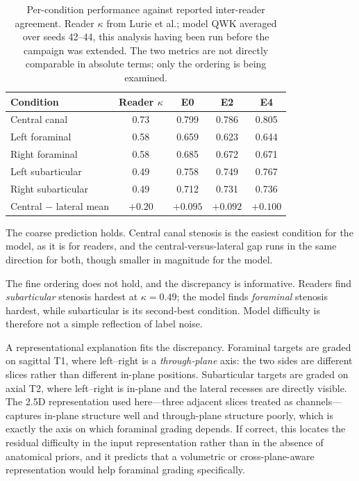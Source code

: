 \documentclass[12pt,a4paper]{report}
\begin{document}
\begin{table}[htbp]
\centering
\caption{Per-condition performance against reported inter-reader agreement.
Reader $\kappa$ from Lurie et al.; model QWK averaged over seeds 42--44, this
analysis having been run before the campaign was extended. The two
metrics are not directly comparable in absolute terms; only the ordering is
being examined.}
\label{tab:disc-ordering}
\begin{tabular}{lcccc}
\toprule
Condition & Reader $\kappa$ & E0 & E2 & E4 \\
\midrule
Central canal        & 0.73 & 0.799 & 0.786 & 0.805 \\
Left foraminal       & 0.58 & 0.659 & 0.623 & 0.644 \\
Right foraminal      & 0.58 & 0.685 & 0.672 & 0.671 \\
Left subarticular    & 0.49 & 0.758 & 0.749 & 0.767 \\
Right subarticular   & 0.49 & 0.712 & 0.731 & 0.736 \\
\midrule
Central $-$ lateral mean & $+0.20$ & $+0.095$ & $+0.092$ & $+0.100$ \\
\bottomrule
\end{tabular}
\end{table}

The coarse prediction holds. Central canal stenosis is the easiest condition for
the model, as it is for readers, and the central-versus-lateral gap runs in the
same direction for both, though smaller in magnitude for the model.

The fine ordering does not hold, and the discrepancy is informative. Readers find
\emph{subarticular} stenosis hardest at $\kappa = 0.49$; the model finds
\emph{foraminal} stenosis hardest, while subarticular is its second-best
condition. Model difficulty is therefore not a simple reflection of label noise.

A representational explanation fits the discrepancy. Foraminal targets are
graded on sagittal T1, where left--right is a \emph{through-plane} axis: the two
sides are different slices rather than different in-plane positions. Subarticular
targets are graded on axial T2, where left--right is in-plane and the lateral
recesses are directly visible. The 2.5D representation used here---three adjacent
slices treated as channels---captures in-plane structure well and through-plane
structure poorly, which is exactly the axis on which foraminal grading depends.
If correct, this locates the residual difficulty in the input representation
rather than in the absence of anatomical priors, and it predicts that a volumetric
or cross-plane-aware representation would help foraminal grading specifically.
\end{document}

